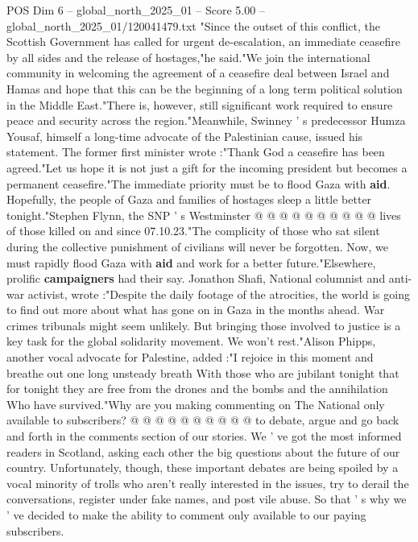 \begin{textsample}{POS Dim 6 – global\_north\_2025\_01 – Score 5.00 – global\_north\_2025\_01/120041479.txt}  \label{ex:f6_pos_346}
"Since the outset of this conflict, the Scottish Government has called for urgent de-escalation, an immediate ceasefire by all sides and the release of hostages,"he said."We join the international community in welcoming the agreement of a ceasefire deal between Israel and Hamas and hope that this can be the beginning of a long term political solution in the Middle East."There is, however, still significant work required to ensure peace and security across the region."Meanwhile, Swinney ' s predecessor Humza Yousaf, himself a long-time advocate of the Palestinian cause, issued his statement.
The former first minister wrote :"Thank God a ceasefire has been agreed."Let us hope it is not just a gift for the incoming president but becomes a permanent ceasefire."The immediate priority must be to flood Gaza with \textbf{aid}.
Hopefully, the people of Gaza and families of hostages sleep a little better tonight."Stephen Flynn, the SNP ' s Westminster @ @ @ @ @ @ @ @ @ @ lives of those killed on and since 07.10.23."The complicity of those who sat silent during the collective punishment of civilians will never be forgotten.
Now, we must rapidly flood Gaza with \textbf{aid} and work for a better future."Elsewhere, prolific \textbf{campaigners} had their say.
Jonathon Shafi, National columnist and anti-war activist, wrote :"Despite the daily footage of the atrocities, the world is going to find out more about what has gone on in Gaza in the months ahead.
War crimes tribunals might seem unlikely.
But bringing those involved to justice is a key task for the global solidarity movement.
We won't rest."Alison Phipps, another vocal advocate for Palestine, added :"I rejoice in this moment and breathe out one long unsteady breath With those who are jubilant tonight that for tonight they are free from the drones and the bombs and the annihilation Who have survived."Why are you making commenting on The National only available to subscribers? @ @ @ @ @ @ @ @ @ @ to debate, argue and go back and forth in the comments section of our stories.
We ' ve got the most informed readers in Scotland, asking each other the big questions about the future of our country.
Unfortunately, though, these important debates are being spoiled by a vocal minority of trolls who aren't really interested in the issues, try to derail the conversations, register under fake names, and post vile abuse.
So that ' s why we ' ve decided to make the ability to comment only available to our paying subscribers.

\end{textsample}
